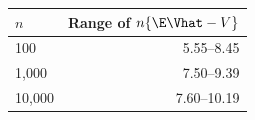 \begin{tabular}{@{}lr@{}}
\toprule
\(n\) & Range of \(n\{\E\Vhat-V\}\)\\
\midrule
100 & 5.55--8.45\\
1,000 & 7.50--9.39\\
10,000 & 7.60--10.19\\
\bottomrule
\end{tabular}
